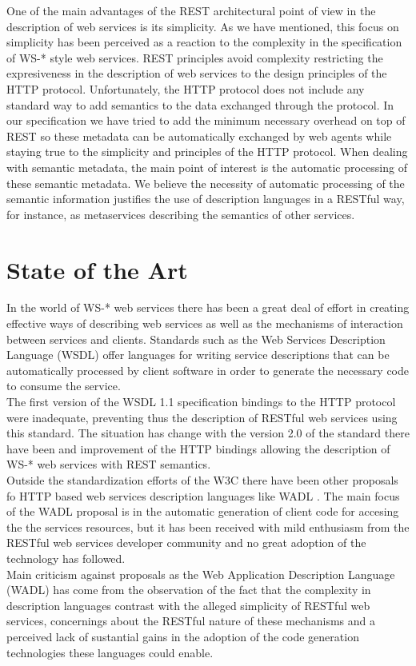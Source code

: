 One of the main advantages of the REST architectural point of view in the description of web services is its
simplicity. As we have mentioned, this focus on simplicity has been perceived as a reaction to the complexity in the
specification of WS-* style web services. REST principles avoid complexity restricting the expresiveness in the
description of web services to the design principles of the HTTP protocol. Unfortunately, the HTTP protocol  does not include any
standard way to add semantics to the data exchanged through the protocol. In our specification we have tried to add the
minimum necessary overhead on top of REST so these metadata can be automatically exchanged by web agents while staying true to the
simplicity and principles of the HTTP protocol. When dealing with semantic metadata, the main point of interest is the automatic processing of these semantic metadata. We believe  the necessity of automatic processing of the semantic information justifies the use of description languages in a RESTful way, for instance, as metaservices describing the semantics of other services.

\section{State of the Art}
In the world of WS-* web services there has been a great deal of effort in creating effective ways of describing web
services as well as the mechanisms of interaction between services and clients. Standards such as the Web Services
Description Language (WSDL) \cite{w3cwsdl}
offer languages for writing service descriptions that can be automatically processed by client software in order to
generate the necessary code to consume the service.\\
The first version of the WSDL 1.1 specification bindings to the HTTP protocol were inadequate, preventing thus the
description of RESTful web services using this standard. The situation has change with the version 2.0 of the standard
\cite{w3cwsdl2} there have been and improvement of the HTTP bindings allowing the description of WS-* web services with
REST semantics.\\
Outside the standardization efforts of the W3C there have been other proposals fo HTTP based web services description
languages like WADL \cite{wadl}. The main focus of the WADL proposal is in the automatic generation of client code for
accesing the the services resources,  but it has been received with mild
enthusiasm from the RESTful web services developer community and no great adoption of the technology has followed. \\
Main criticism against proposals as the Web Application Description Language (WADL) \cite{greg2007} has come from the observation of the
fact that the complexity in description languages contrast with the alleged simplicity of RESTful web services,
concernings about the RESTful nature of these mechanisms and a perceived lack of sustantial gains in the adoption of the
code generation technologies these languages could enable.\\

